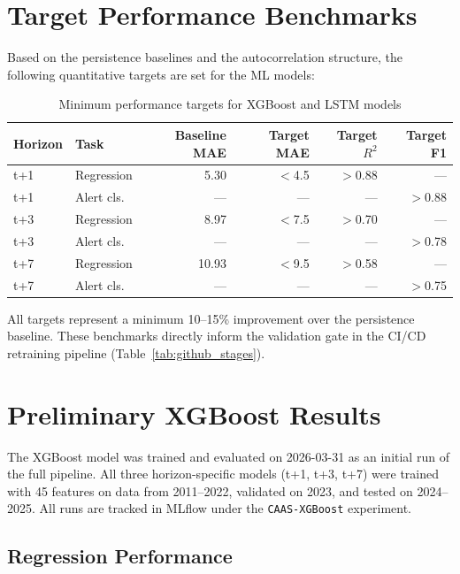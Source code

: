 \documentclass[12pt,a4paper]{report}
\begin{document}
\section{Target Performance Benchmarks}

Based on the persistence baselines and the autocorrelation structure, the following quantitative targets are set for the ML models:

\begin{table}[H]
\centering
\caption{Minimum performance targets for XGBoost and LSTM models}
\label{tab:targets}
\begin{tabular}{@{}llrrrr@{}}
\toprule
\textbf{Horizon} & \textbf{Task} & \textbf{Baseline MAE} & \textbf{Target MAE} & \textbf{Target $R^2$} & \textbf{Target F1} \\
\midrule
t+1 & Regression  & 5.30  & ${<}$4.5  & ${>}$0.88 & --- \\
t+1 & Alert cls.  & ---   & ---       & ---       & ${>}$0.88 \\
t+3 & Regression  & 8.97  & ${<}$7.5  & ${>}$0.70 & --- \\
t+3 & Alert cls.  & ---   & ---       & ---       & ${>}$0.78 \\
t+7 & Regression  & 10.93 & ${<}$9.5  & ${>}$0.58 & --- \\
t+7 & Alert cls.  & ---   & ---       & ---       & ${>}$0.75 \\
\bottomrule
\end{tabular}
\end{table}

All targets represent a minimum 10--15\% improvement over the persistence baseline. These benchmarks directly inform the validation gate in the CI/CD retraining pipeline (Table~\ref{tab:github_stages}).

\section{Preliminary XGBoost Results}

The XGBoost model was trained and evaluated on 2026-03-31 as an initial run of the full pipeline. All three horizon-specific models (t+1, t+3, t+7) were trained with 45 features on data from 2011--2022, validated on 2023, and tested on 2024--2025. All runs are tracked in MLflow under the \texttt{CAAS-XGBoost} experiment.

\subsection{Regression Performance}
\end{document}
